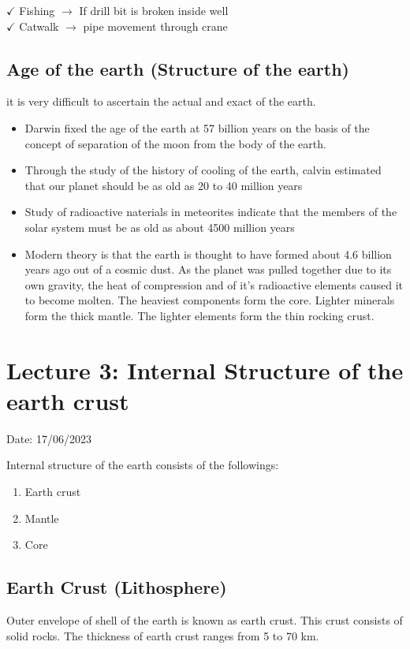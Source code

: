 \documentclass{article}
\begin{document}
$\checkmark$ Fishing $\rightarrow$ If drill bit is broken inside well \\
$\checkmark$ Catwalk $\rightarrow$ pipe movement through crane 

\subsection*{Age of the earth (Structure of the earth)}
it is very difficult to ascertain the actual and exact of the earth. 
\begin{itemize}
  \item Darwin fixed the age of the earth at 57 billion years on the basis of the concept of separation of the moon from the body of the earth.
  \item Through the study of the history of cooling of the earth, calvin estimated that our planet should be as old as 20 to 40 million years 
  \item Study of radioactive naterials in meteorites indicate that the members of the solar system must be as old as about 4500 million years 
  \item Modern theory is that the earth is thought to have formed about 4.6 billion years ago out of a cosmic dust. As the planet was pulled together due to its own gravity, the heat of compression and of it's radioactive elements caused it to become molten. The heaviest components form the core. Lighter minerals form the thick mantle. The lighter elements form the thin rocking crust. 
\end{itemize}


\section{Lecture 3: Internal Structure of the earth crust}
\hfill Date: 17/06/2023 

Internal structure of the earth consists of the followings:
\begin{enumerate}
  \item Earth crust 
  \item Mantle 
  \item Core 
\end{enumerate}

\subsection*{Earth Crust (Lithosphere)}
Outer envelope of shell of the earth is known as earth crust. This crust consists of solid rocks. The thickness of earth crust ranges from 5 to 70 km.
\end{document}
